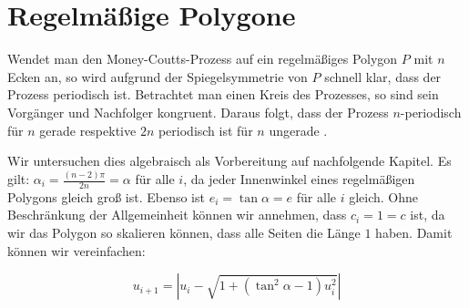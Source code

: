 \chapter{Regelmäßige Polygone}
\label{regular-polygon:chapter}

Wendet man den Money-Coutts-Prozess auf ein regelmäßiges Polygon $P$ mit $n$ Ecken an, so wird aufgrund der Spiegelsymmetrie von $P$ schnell klar,
dass der Prozess periodisch ist.
Betrachtet man einen Kreis des Prozesses, so sind sein Vorgänger und Nachfolger kongruent.
Daraus folgt, dass der Prozess $n$-periodisch für $n$ gerade respektive $2n$ periodisch ist für $n$ ungerade \citep{Taba2000}.

Wir untersuchen dies algebraisch als Vorbereitung auf nachfolgende Kapitel.
Es gilt: $\alpha_i = \frac{(n-2) \pi}{2n} = \alpha$ für alle $i$, da jeder Innenwinkel eines regelmäßigen Polygons gleich groß ist.
Ebenso ist $e_i=\tan \alpha = e$ für alle $i$ gleich.
Ohne Beschränkung der Allgemeinheit können wir annehmen, dass $c_i=1 = c$ ist,
da wir das Polygon so skalieren können, dass alle Seiten die Länge $1$ haben.
Damit können wir  vereinfachen:

\begin{equation}
    u_{i+1}=|u_i-\sqrt{1+(\tan^2\alpha-1) u_i^2}|
\end{equation}

